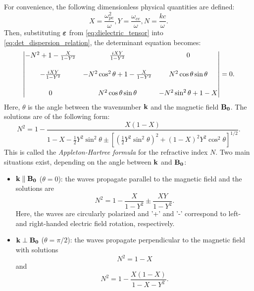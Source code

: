 For convenience, the following dimensionless physical quantities are defined:%
\begin{equation}
   X = \frac{\omega_{pe}^2}{\omega},  Y = \frac{\omega_{ce}}{\omega},  N = \frac{kc}{\omega}.
\end{equation}
\noindent Then, substituting $\boldsymbol{\mathrm{\varepsilon}}$ from \eqref{eq:dielectric_tensor} into \eqref{eq:det_dispersion_relation}, the determinant equation becomes:%
\begin{equation}
\begin{vmatrix}
\vspace{0.5cm}
-N^2+1-\frac{X}{1-Y^2} & \frac{iXY}{1-Y^2} & 0 \\
\vspace{0.5cm}
-\frac{iXY}{1-Y^2} & -N^2\cos^2\theta+1-\frac{X}{1-Y^2} & N^2\cos\theta\sin\theta \\
0 & N^2\cos\theta\sin\theta & -N^2\sin^2\theta+1-X
\end{vmatrix} = 0.
\end{equation}
\noindent Here, $\theta$ is the angle between the wavenumber $\boldsymbol{\mathrm{k}}$ and the magnetic field $\boldsymbol{\mathrm{B_0}}$. The solutions are of the following form:%
\begin{equation}
N^2 = 1 - \frac{X(1-X)}{1-X-\frac{1}{2}Y^2\sin^2\theta\pm[(\frac{1}{2}Y^2\sin^2\theta)^2+(1-X)^2Y^2\cos^2\theta]^{1/2}}.
\end{equation}
\noindent This is called the \emph{Appleton-Hartree formula} for the refractive index $N$. Two main situations exist, depending on the angle between $\boldsymbol{\mathrm{k}}$ and $\boldsymbol{\mathrm{B_0}}$:
%
\begin{itemize}
  \item $\boldsymbol{\mathrm{k}} \parallel \boldsymbol{\mathrm{B_0}}$ ($\theta = 0$): the waves propagate parallel to the magnetic field and the solutions are %
      \begin{equation}
        N^2=1-\frac{X}{1-Y^2}\pm\frac{XY}{1-Y^2}.
      \end{equation}
      Here, the waves are circularly polarized and '+' and '-' correspond to left- and right-handed electric field rotation, respectively.
%
  \item $\boldsymbol{\mathrm{k}} \perp \boldsymbol{\mathrm{B_0}}$ ($\theta = \pi/2$): the waves propagate perpendicular to the magnetic field with solutions %
      \begin{equation}\label{eq:Omode_index}
        N^2=1-X
      \end{equation}
      and
      \begin{equation}\label{eq:Xmode_index}
        N^2=1-\frac{X(1-X)}{1-X-Y^2}.
      \end{equation}
\end{itemize}


